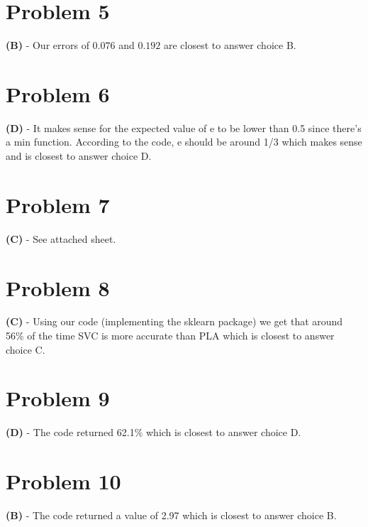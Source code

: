 \documentclass[10pt,letter]{article}
\begin{document}
\section*{Problem 5}

\textbf{(B)} - Our errors of $0.076$ and $0.192$ are closest to answer choice B.

\section*{Problem 6}

\textbf{(D)} - It makes sense for the expected value of e to be lower than 0.5 since there's a min function. According to the code, e should be around 1/3 which makes sense and is closest to answer choice D.

\section*{Problem 7}

\textbf{(C)} - See attached sheet.

\section*{Problem 8}

\textbf{(C)} - Using our code (implementing the sklearn package) we get that around 56\% of the time SVC is more accurate than PLA which is closest to answer choice C.

\section*{Problem 9}

\textbf{(D)} - The code returned 62.1\% which is closest to answer choice D.

\section*{Problem 10}

\textbf{(B)} - The code returned a value of 2.97 which is closest to answer choice B.
\end{document}

